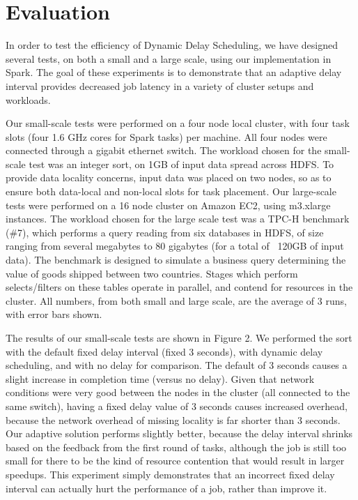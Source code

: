 
\section{Evaluation}\label{sec:eval}

In order to test the efficiency of Dynamic Delay Scheduling, we have designed several 
tests, on both a small and a large scale, using our implementation in Spark. The goal of
these experiments is to demonstrate that an adaptive delay interval provides decreased
job latency in a variety of cluster setups and workloads.

Our small-scale tests were performed on a four node local cluster, with four task slots 
(four 1.6 GHz cores for Spark tasks) per machine. All four nodes were connected through 
a gigabit ethernet switch. The workload chosen for the small-scale test was an integer 
sort, on 1GB of input data spread across HDFS. To provide data locality concerns, 
input data was placed on two nodes, so as to ensure both data-local and non-local
slots for task placement. Our large-scale tests were performed on a 16 node cluster on 
Amazon EC2, using m3.xlarge instances. The workload chosen for the large scale test was 
a TPC-H benchmark (\#7), which performs a query reading from six databases in HDFS, of 
size ranging from several megabytes to 80 gigabytes (for a total of ~120GB of input data).
The benchmark is designed to simulate a business query determining the value of goods 
shipped between two countries. Stages which perform selects/filters on these tables 
operate in parallel, and contend for resources in the cluster. All numbers, from both 
small and large scale, are the average of 3 runs, with error bars shown.

The results of our small-scale tests are shown in Figure 2. We performed the sort with the
default fixed delay interval (fixed 3 seconds), with dynamic delay scheduling, and with no
delay for comparison. The default of 3 seconds causes a slight increase in completion
time (versus no delay). Given that network conditions were very good between the nodes
in the cluster (all connected to the same switch), having a fixed delay value of 3 seconds
causes increased overhead, because the network overhead of missing locality is far shorter
than 3 seconds. Our adaptive solution performs slightly better, because the
delay interval shrinks based on the feedback from the first round of tasks, although the 
job is still too small for there to be the kind of resource contention that would result 
in larger speedups. This experiment simply demonstrates that an incorrect fixed delay
interval can actually hurt the performance of a job, rather than improve it.

